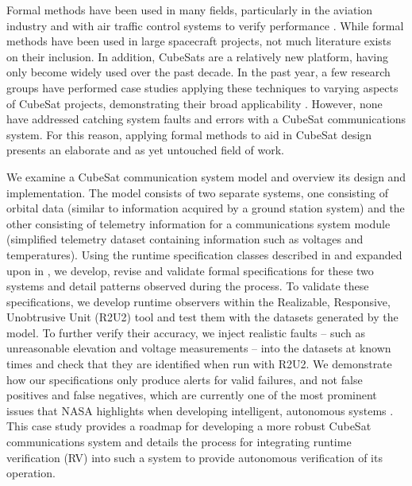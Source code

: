 \documentclass[conf]{new-aiaa}
\begin{document}
Formal methods have been used in many fields, particularly in the aviation industry and with air traffic control systems to verify performance \cite{GCMTR16,DRR17}. While formal methods have been used in large spacecraft projects, not much literature exists on their inclusion. In addition,
CubeSats are a relatively new platform, having only become widely used over the past decade. In the past year, a few research groups have performed case studies applying these techniques to varying aspects of CubeSat projects, demonstrating their broad applicability \cite{Boufaied2020,Gross2020}. However, none have addressed catching %
system faults and errors with a CubeSat communications system. For this reason, applying formal methods to aid in CubeSat design presents an elaborate and as yet untouched field of work.

We examine a CubeSat communication system model and overview its design and implementation. The model consists of two separate systems,%
one consisting of orbital data (similar to information acquired by a ground station system) and the other consisting of telemetry information for a communications system module (simplified telemetry dataset containing information such as voltages and temperatures). Using the runtime specification classes described in \cite{Roz16} and expanded upon in \cite{Cauwels2020}, we develop, revise and validate formal specifications for these two systems and detail patterns observed during the process. To validate these specifications, we develop runtime observers within the Realizable, Responsive, Unobtrusive Unit (R2U2) tool and test them with the datasets generated by the model. To further verify their accuracy, we inject realistic faults -- such as unreasonable elevation and voltage measurements -- into the datasets at known times and check that they are identified when run with R2U2. We demonstrate how our specifications only produce alerts for valid failures, and not false positives and false negatives, which are currently one of the most prominent issues that NASA highlights when developing intelligent, autonomous systems \cite{Roadmap2015}. This case study provides a roadmap for developing a more robust CubeSat communications system and details the process for integrating runtime verification (RV) into such a system to provide autonomous verification of its operation.
\end{document}
